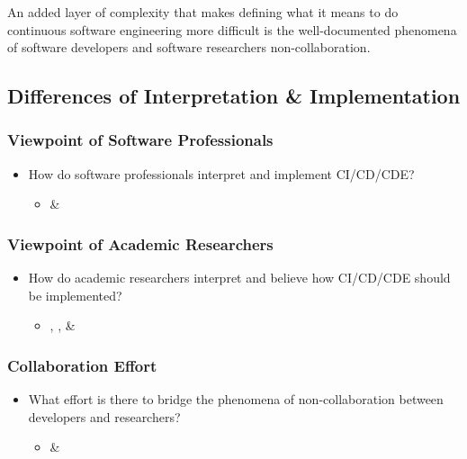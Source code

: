 \documentclass[12pt,a4paper]{article}
\begin{document}
An added layer of complexity that makes defining what it means to do continuous software engineering more difficult is the well-documented phenomena of software developers and software researchers non-collaboration.
    
    \subsection{Differences of Interpretation \& Implementation}
        \subsubsection{Viewpoint of Software Professionals}
        \begin{itemize}[noitemsep]
            \item How do software professionals interpret and implement CI/CD/CDE?
            \begin{itemize}
                \item \cite{atkinson_edwards_2018} \& \cite{stackify_2018}
            \end{itemize}
        \end{itemize}
        \subsubsection{Viewpoint of Academic Researchers}
        \begin{itemize}[noitemsep]
            \item How do academic researchers interpret and believe how CI/CD/CDE should be implemented?
            \begin{itemize}
                \item \cite{bosch_2014}, \cite{shahin_babar_zhu_2017}, \& \cite{stahl_2017}
            \end{itemize}
        \end{itemize}
        \subsubsection{Collaboration Effort}
        \begin{itemize}[noitemsep]
            \item What effort is there to bridge the phenomena of non-collaboration between developers and researchers?
            \begin{itemize}
                \item \cite{bosch_2014} \& \cite{stahl_2017}
            \end{itemize}
        \end{itemize}
\end{document}
